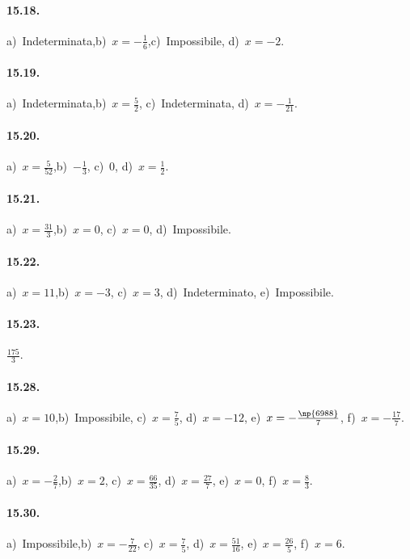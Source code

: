 \paragraph{15.18.}
a)~Indeterminata,\quad b)~$x=-\frac{1}{6}$,\quad c)~Impossibile, \quad d)~$x=-2$.

\paragraph{15.19.}
a)~Indeterminata,\quad b)~$x=\frac{5}{2}$, \quad c)~Indeterminata, \quad d)~$x=-\frac{1}{21}$.

\paragraph{15.20.}
a)~$x=\frac{5}{52}$,\quad b)~$-\frac{1}{3}$, \quad c)~$0$, \quad d)~$x=\frac{1}{2}$.

\paragraph{15.21.}
a)~$x=\frac{31}{3}$,\quad b)~$x=0$, \quad c)~$x=0$, \quad d)~Impossibile.

\paragraph{15.22.}
a)~$x=11$,\quad b)~$x=-3$, \quad c)~$x=3$, \quad d)~Indeterminato, \quad e)~Impossibile. %

\paragraph{15.23.}
$\frac{175}{3}$.

\paragraph{15.28.}
a)~$x=10$,\quad b)~Impossibile, \quad c)~$x=\frac{7}{5}$, \quad d)~$x=-12$, \quad e)~$x=-\frac{\np{6988}}{7}$, \quad f)~$x=-\frac{17}{7}$.

\paragraph{15.29.}
a)~$x=-{\frac{2}{7}}$,\quad b)~$x=2$, \quad c)~$x=\frac{66}{35}$, \quad d)~$x=\frac{27}{7}$, \quad e)~$x=0$, \quad f)~$x=\frac{8}{3}$.

\paragraph{15.30.}
a)~Impossibile,\quad b)~$x=-{\frac{7}{22}}$, \quad c)~$x=\frac{7}{5}$, \quad d)~$x=\frac{51}{16}$, \quad e)~$x=\frac{26}{5}$, \quad f)~$x=6$.

